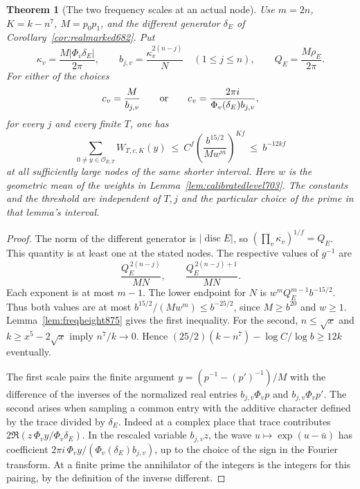 \documentclass[a4paper,11pt]{article}
\newtheorem{theorem}[proposition]{Theorem}
\theoremstyle{definition}
\theoremstyle{remark}
\numberwithin{equation}{section}
\begin{document}
\begin{theorem}[The two frequency scales at an actual node]\leavevmode
\label{thm:freqnode875}
Use \(m=2n\), \(K=k-n^7\), \(M=p_0p_1\), and the different generator
\(\delta_E\) of Corollary~\ref{cor:realmarked682}. Put
\[
 \kappa_v=\frac{M|\Phi_v\delta_E|}{2\pi},\qquad
 b_{j,v}=\frac{\kappa_v^{2(n-j)}}{N}\quad(1\le j\le n),\qquad
 Q_E=\frac{M\rho_E}{2\pi}.
\]
For either of the choices
\[
   c_v=\frac{M}{b_{j,v}}
   \qquad\hbox{or}\qquad
   c_v=\frac{2\pi i}{\Phi_v(\delta_E)b_{j,v}},
\]
for every \(j\) and every finite \(T\), one has
\begin{equation}
 \sum_{0\ne y\in\mathcal O_{E,T}} W_{T,c,K}(y)
 \ \le\ C^f
       \left(\frac{b^{15/2}}{M w^m}\right)^{K f}
 \ \le\ b^{-12kf}
 \label{eq:actualfreq875}
\end{equation}
at all sufficiently large nodes of the same shorter interval.
Here \(w\) is the geometric mean of the weights in
Lemma~\ref{lem:calibratedlevel703}. The constants and the threshold
are independent of \(T,j\) and the particular choice of the prime
in that lemma's interval.
\end{theorem}
\begin{proof}
The norm of the different generator is \(|\operatorname{disc}E|\),
so \((\prod_v\kappa_v)^{1/f}=Q_E\). This quantity is at least one at
the stated nodes. The respective values of \(g^{-1}\) are
\[
       \frac{Q_E^{\,2(n-j)}}{MN},
       \qquad
       \frac{Q_E^{\,2(n-j)+1}}{MN}.
\]
Each exponent is at most \(m-1\). The lower endpoint for \(N\) is
\(w^m Q_E^{m-1}b^{-15/2}\). Thus both values are at most
\(b^{15/2}/(M w^m)\le b^{-25/2}\), since \(M\ge b^{20}\)
and \(w\ge1\). Lemma~\ref{lem:freqheight875} gives the first inequality.
For the second, \(n\le\sqrt x\) and \(k\ge x^5-2\sqrt x\) imply
\(n^7/k\longrightarrow0\). Hence
\((25/2)(k-n^7)-\log C/\log b\ge12k\) eventually.

The first scale pairs the finite argument
\(y=(p^{-1}-(p')^{-1})/M\) with the difference of the inverses of
the normalized real entries \(b_{j,v}\Phi_v p\) and
\(b_{j,v}\Phi_v p'\). The second arises when sampling a common entry
with the additive character defined by the trace divided by
\(\delta_E\). Indeed at a complex place that trace contributes
\(2\Re(z\,\Phi_v y/\Phi_v\delta_E)\). In the rescaled variable
\(b_{j,v}z\), the wave \(u\mapsto\exp(u-\bar u)\) has coefficient
\(2\pi i\,\Phi_v y/(\Phi_v(\delta_E)b_{j,v})\), up to the choice
of the sign in the Fourier transform. At a finite prime the
annihilator of the integers is the integers for this pairing,
by the definition of the inverse different.
\end{proof}
\end{document}
